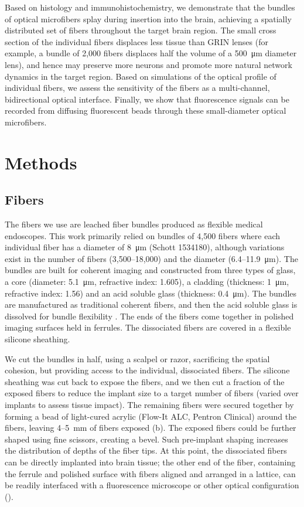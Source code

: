 Based on histology and immunohistochemistry, we demonstrate that the 
bundles of optical microfibers splay during insertion into the brain, 
achieving a spatially distributed set of fibers throughout the target 
brain region. The small cross section of the individual fibers displaces 
less tissue than GRIN lenses (for example, a bundle of 2,000 fibers 
displaces half the volume of a 500~\si{\micro\meter} diameter lens), 
and hence may preserve more neurons and promote more natural network 
dynamics in the target region. Based on simulations 
of the optical profile of individual fibers, we assess the sensitivity of 
the fibers as a multi-channel, bidirectional optical interface. Finally, 
we show that fluorescence signals can be recorded from diffusing 
fluorescent beads through these small-diameter optical microfibers.

\section{Methods}
\label{sec:methods}

\subsection{Fibers}

The fibers we use are leached fiber bundles produced as flexible medical 
endoscopes. This work primarily relied on bundles of 4,500 fibers where 
each individual fiber has a diameter of 8~\si{\micro\meter} (Schott 1534180), although 
variations exist in the number of fibers (3,500--18,000) and the diameter 
(6.4--11.9~\si{\micro\meter}). The bundles are built for coherent imaging and constructed 
from three types of glass, a core (diameter: 5.1~\si{\micro\meter}, refractive index: 
1.605), a cladding (thickness: 1~\si{\micro\meter}, refractive index: 1.56) and an 
acid soluble glass (thickness: 0.4~\si{\micro\meter}). The bundles are manufactured 
as traditional coherent 
fibers, and then the acid soluble glass is dissolved for bundle 
flexibility \cite{Gerstner:2004to}. The ends of the fibers come together 
in polished imaging surfaces held in ferrules. The dissociated fibers are covered 
in a flexible silicone sheathing.

We cut the bundles in half, using a scalpel or razor, sacrificing the spatial 
cohesion, but providing access to the individual, dissociated fibers. The silicone 
sheathing was cut back to expose the fibers, and we then cut a fraction of the 
exposed fibers to reduce the implant size to a target number of fibers (varied 
over implants to assess tissue impact). The remaining fibers were secured 
together by forming a bead of light-cured acrylic (Flow-It ALC, Pentron Clinical) 
around the fibers, leaving 4--5~mm of fibers exposed (b). The exposed fibers could be 
further shaped using fine scissors, creating a bevel. Such pre-implant shaping 
increases the distribution of depths of the fiber tips. At this point, the 
dissociated fibers can be directly implanted into brain tissue; the other end of 
the fiber, containing the ferrule and polished surface with fibers aligned and 
arranged in a lattice, can be readily interfaced with a fluorescence microscope or 
other optical configuration ().



